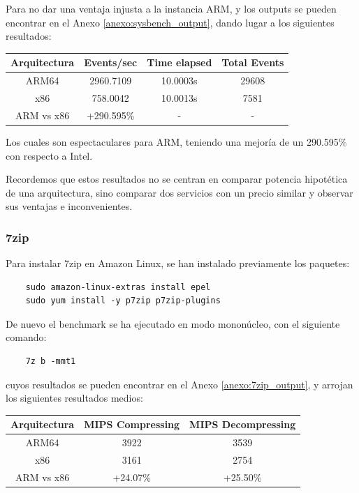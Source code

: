 \documentclass[a4paper,openright,12pt]{article}
\begin{document}
Para no dar una ventaja injusta a la instancia ARM, y los outputs se pueden encontrar en el Anexo \ref{anexo:sysbench_output}, dando lugar
a los siguientes resultados:

\begin{center}
\begin{tabular}{ | c | c | c | c | }
    \hline
    Arquitectura           &   Events/sec  &   Time elapsed &   Total Events    \\
    \hline
    ARM64                  &   2960.7109   &   10.0003s     &   29608           \\
    \hline
    x86                    &   758.0042    &   10.0013s     &   7581            \\
    \hline
    \hline
    ARM vs x86             &   +290.595\%  &   -     &   -    \\
    \hline
\end{tabular}
\end{center}

Los cuales son espectaculares para ARM, teniendo una mejoría de un 290.595\% con respecto a Intel.

Recordemos que estos resultados no se centran en comparar potencia hipotética de una arquitectura, sino comparar dos servicios con un precio similar y observar sus ventajas e inconvenientes.


\subsubsection{7zip}
Para instalar 7zip en Amazon Linux, se han instalado previamente los paquetes:
\begin{verbatim}
    sudo amazon-linux-extras install epel
    sudo yum install -y p7zip p7zip-plugins
\end{verbatim}

De nuevo el benchmark se ha ejecutado en modo mononúcleo, con el siguiente comando:
\begin{verbatim}
    7z b -mmt1
\end{verbatim}
cuyos resultados se pueden encontrar en el Anexo \ref{anexo:7zip_output}, y arrojan los siguientes resultados medios:

\begin{center}
\begin{tabular}{ | c | c | c | }
    \hline
    Arquitectura           &   MIPS Compressing  &  MIPS Decompressing  \\
    \hline
    ARM64                  &   3922              &   3539               \\
    \hline
    x86                    &   3161              &   2754               \\
    \hline
    \hline
    ARM vs x86             &   +24.07\%          &   +25.50\%           \\
    \hline
\end{tabular}
\end{center}
\end{document}
